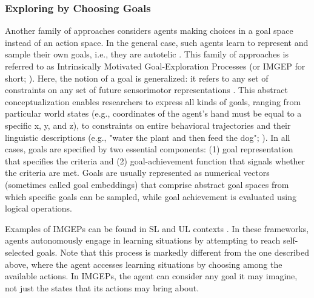 \subsubsection{Exploring by Choosing Goals}\label{CH3_SSS_exploring_by_choosing_goals}
Another family of approaches considers agents making choices in a goal space instead of an action space. In the general case, such agents learn to represent and sample their own goals, i.e., they are autotelic \parencite{colas_intrinsically_2021}. This family of approaches is referred to as Intrinsically Motivated Goal-Exploration Processes (or IMGEP for short; \parencite{forestier_intrinsically_2020,colas_intrinsically_2021}). Here, the notion of a goal is generalized: it refers to any set of constraints on any set of future sensorimotor representations \parencite{colas_intrinsically_2021}. This abstract conceptualization enables researchers to express all kinds of goals, ranging from particular world states (e.g., coordinates of the agent’s hand must be equal to a specific x, y, and z), to constraints on entire behavioral trajectories and their linguistic descriptions (e.g., "water the plant and then feed the dog"; \parencite{colas_language_2020}). In all cases, goals are specified by two essential components: (1) goal representation that specifies the criteria and (2) goal-achievement function that signals whether the criteria are met. Goals are usually represented as numerical vectors (sometimes called goal embeddings) that comprise abstract goal spaces from which specific goals can be sampled, while goal achievement is evaluated using logical operations.

Examples of IMGEPs can be found in SL and UL contexts \parencite{jordan_forward_1992,rolf_goal_2010,baranes_active_2013,moulin-frier_exploration_2013,forestier_intrinsically_2020,takahashi_dynamic_2017,reinke_intrinsically_2020,laversanne-finot_curiosity_2018}. In these frameworks, agents autonomously engage in learning situations by attempting to reach self-selected goals. Note that this process is markedly different from the one described above, where the agent accesses learning situations by choosing among the available actions. In IMGEPs, the agent can consider any goal it may imagine, not just the states that its actions may bring about.

